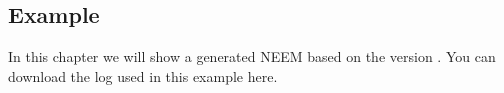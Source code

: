 \subsection{Example}
	\label{ch:example}
	In this chapter we will show a generated NEEM based on the version \neemversion.
	You can download the log used in this example here.	
								
	
%	
%	
